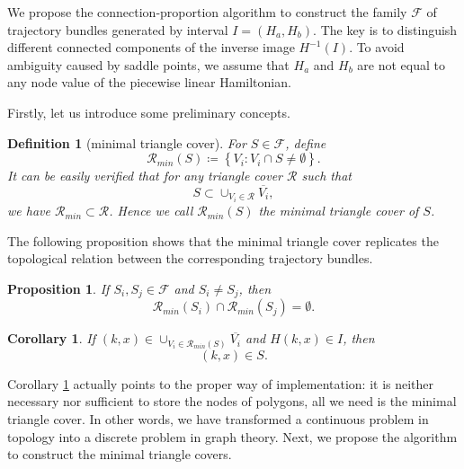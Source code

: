 \documentclass{article}
\newtheorem{prop}{Proposition}
\newtheorem{defi}{Definition}
\newtheorem{coro}{Corollary}
\numberwithin{equation}{section}
\begin{document}
We propose the connection-proportion algorithm to construct the family $\mathcal{F}$ of trajectory bundles generated by interval $I = (H_{a}, H_{b})$.  The key is to distinguish different connected components of the inverse image $H^{-1}(I)$. To avoid ambiguity caused by saddle points, we assume that $H_{a}$ and $H_{b}$ are not equal to any node value of the piecewise linear Hamiltonian. 

Firstly, let us introduce some preliminary concepts.

\begin{defi}[minimal triangle cover]
    For $S\in \mathcal{F}$, define
    \begin{equation*}
        \mathcal{R}_{min}(S) \coloneqq \left\{ V_{i}:V_{i}\cap S\neq\emptyset\right\}.
    \end{equation*}
    It can be easily verified that for any triangle cover $\mathcal{R}$ such that 
    \begin{equation*}
        S\subset\cup_{V_{i}\in\mathcal{R}}\overline{V_{i}},
    \end{equation*}
    we have $\mathcal{R}_{min} \subset \mathcal{R}$. Hence we call $\mathcal{R}_{min}(S)$ the minimal triangle cover of $S$.
\end{defi}

The following proposition shows that the minimal triangle cover replicates the topological relation between the corresponding trajectory bundles. 
\begin{prop} 
    If $S_{i}, S_{j}\in \mathcal{F}$ and $S_{i} \neq S_{j}$, then 
    \begin{equation*}
        \mathcal{R}_{min}(S_{i}) \cap \mathcal{R}_{min}(S_{j}) = \emptyset.
    \end{equation*}
\end{prop}

\begin{coro}\label{distinguish}
    If $(k,x) \in \cup_{V_{i}\in\mathcal{R}_{min}(S)}\overline{V_{i}}$ and $H(k,x) \in I$, then
    \begin{equation*}
        (k,x) \in S.
    \end{equation*}
\end{coro}

Corollary \ref{distinguish} actually points to the proper way of implementation: it is neither necessary nor sufficient to store the nodes of polygons, all we need is the minimal triangle cover. In other words, we have transformed a continuous problem in topology into a discrete problem in graph theory. Next, we propose the algorithm to construct the minimal triangle covers.
\end{document}
